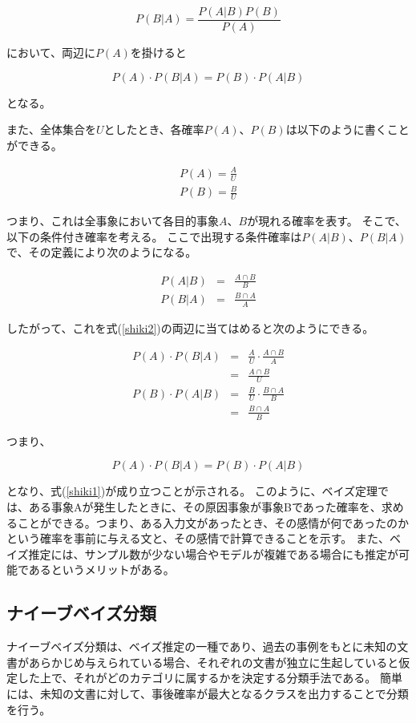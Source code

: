 \documentclass[11pt,a4j]{jsarticle}
\begin{document}
\begin{equation}
P(B|A)=\frac{P(A|B)P(B)}{P(A)}
\label{shiki1}
\end{equation}

において、両辺に$P(A)$を掛けると

\begin{equation}
  P(A) \cdot P(B|A)=P(B) \cdot P(A|B) \label{shiki2}
\end{equation}

となる。

また、全体集合を$U$としたとき、各確率$P(A)$、$P(B)$は以下のように書くことができる。

\begin{eqnarray*}
P(A) = \frac{A}{U}\\
P(B) = \frac{B}{U}
\end{eqnarray*}

つまり、これは全事象において各目的事象$A$、$B$が現れる確率を表す。
そこで、以下の条件付き確率を考える。
ここで出現する条件確率は$P(A|B)$、$P(B|A)$で、その定義により次のようになる。

\begin{eqnarray*}
P(A|B) & = & \frac{A \cap B}{B}\\
P(B|A) & = & \frac{B \cap A}{A}
\end{eqnarray*}

したがって、これを式(\ref{shiki2})の両辺に当てはめると次のようにできる。

\begin{eqnarray*}
P(A) \cdot P(B|A) & = & \frac{A}{U} \cdot \frac{A \cap B}{A}\\
               & = & \frac{A \cap B}{U}\\
P(B) \cdot P(A|B)  & = &\frac{B}{U} \cdot \frac{B \cap A}{B}\\
                  & = & \frac{B \cap A}{B}
\end{eqnarray*}

つまり、

\[ P(A) \cdot P(B|A)=P(B) \cdot P(A|B) \]

となり、式(\ref{shiki1})が成り立つことが示される。
このように、ベイズ定理では、ある事象Aが発生したときに、その原因事象が事象Bであった確率を、求めることができる。つまり、ある入力文があったとき、その感情が何であったのかという確率を事前に与える文と、その感情で計算できることを示す。
また、ベイズ推定には、サンプル数が少ない場合やモデルが複雑である場合にも推定が可能であるというメリットがある。

 \subsection{ナイーブベイズ分類}\label{sec:defnaivebayes}
ナイーブベイズ分類は、ベイズ推定の一種であり、過去の事例をもとに未知の文書があらかじめ与えられている場合、それぞれの文書が独立に生起していると仮定した上で、それがどのカテゴリに属するかを決定する分類手法である。
簡単には、未知の文書に対して、事後確率が最大となるクラスを出力することで分類を行う。
\end{document}
